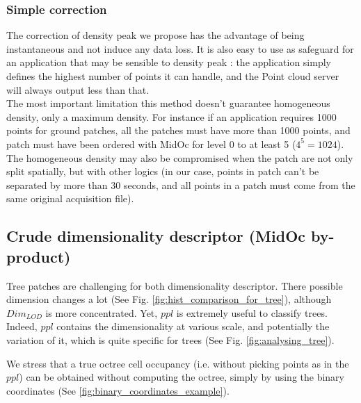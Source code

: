 		\subsubsection{Simple correction}
		The correction of density peak we propose has the advantage of being instantaneous and not induce any data loss.
		It is also easy to use as safeguard for an application that may be sensible to density peak : the application simply defines the highest number of points \per \cubic \meter it can handle, and the Point cloud server will always output less than that.
		\\
		The most important limitation this method doesn't guarantee homogeneous density, only a maximum density.
		For instance if an application requires 1000 points \per \cubic \meter for ground patches, all the patches must have more than 1000 points, and patch must have been ordered with MidOc for level 0 to at least 5 ($4^5=1024$). 
		The homogeneous density may also be compromised when the patch are not only split spatially, but with other logics (in our case, points in patch can't be separated by more than 30 seconds, and all points in a patch must come from the same original acquisition file).
		
	\subsection{Crude dimensionality descriptor (MidOc by-product)}	 
		
		Tree patches are challenging for both dimensionality descriptor.
		There possible dimension changes a lot (See Fig. \ref{fig:hist_comparison_for_tree}), although $Dim_{LOD}$ is more concentrated.
		Yet, $ppl$ is extremely useful to classify trees.
		Indeed, $ppl$ contains the dimensionality at various scale, and potentially the variation of it, which is quite specific for trees (See Fig. \ref{fig:analysing_tree}).
		  
			
		We stress that a true octree cell occupancy (i.e. without picking points as in the $ppl$) can be obtained without computing the octree, simply by using the binary coordinates (See \ref{fig:binary_coordinates_example}).
		
